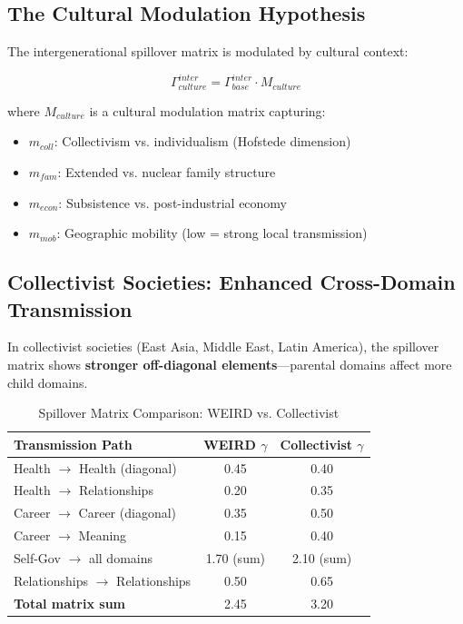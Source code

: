 \subsection{The Cultural Modulation Hypothesis}

The intergenerational spillover matrix is modulated by cultural context:

\begin{equation}
\Gamma^{inter}_{culture} = \Gamma^{inter}_{base} \cdot M_{culture}
\end{equation}

where $M_{culture}$ is a cultural modulation matrix capturing:
\begin{itemize}[nosep]
\item $m_{coll}$: Collectivism vs. individualism (Hofstede dimension)
\item $m_{fam}$: Extended vs. nuclear family structure
\item $m_{econ}$: Subsistence vs. post-industrial economy
\item $m_{mob}$: Geographic mobility (low = strong local transmission)
\end{itemize}

\subsection{Collectivist Societies: Enhanced Cross-Domain Transmission}

In collectivist societies (East Asia, Middle East, Latin America), the spillover matrix
shows \textbf{stronger off-diagonal elements}---parental domains affect more child domains.

\begin{table}[htbp]
\centering
\caption{Spillover Matrix Comparison: WEIRD vs. Collectivist}
\label{tab:BI-cultural-spillover}
\renewcommand{\arraystretch}{1.2}
\small
\begin{tabular}{@{}lcc@{}}
\toprule
\textbf{Transmission Path} & \textbf{WEIRD $\gamma$} & \textbf{Collectivist $\gamma$} \\
\midrule
Health $\rightarrow$ Health (diagonal) & 0.45 & 0.40 \\
Health $\rightarrow$ Relationships & 0.20 & \cellcolor{green!15}0.35 \\
Career $\rightarrow$ Career (diagonal) & 0.35 & \cellcolor{green!15}0.50 \\
Career $\rightarrow$ Meaning & 0.15 & \cellcolor{green!15}0.40 \\
Self-Gov $\rightarrow$ all domains & 1.70 (sum) & \cellcolor{green!15}2.10 (sum) \\
Relationships $\rightarrow$ Relationships & 0.50 & \cellcolor{green!15}0.65 \\
\midrule
\textbf{Total matrix sum} & 2.45 & \cellcolor{green!15}3.20 \\
\bottomrule
\end{tabular}
\end{table}

